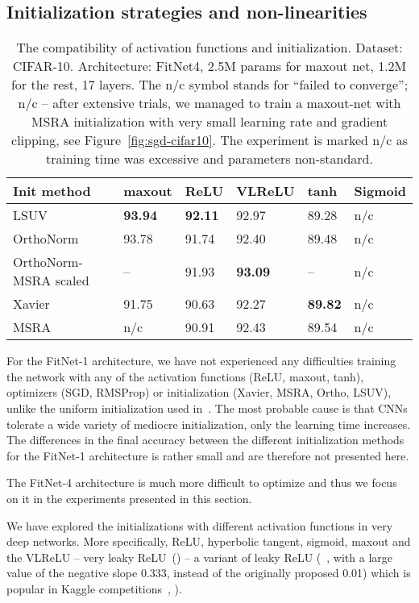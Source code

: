 \documentclass{article} \clearpage{}\usepackage{iclr2016_conference,times}
\begin{document}
\subsection{Initialization strategies and non-linearities}
\begin{table}[htb]
\caption{The compatibility of activation functions and initialization.
\hspace{\textwidth}
Dataset: CIFAR-10. Architecture: FitNet4, 2.5M params for maxout net, 1.2M for the rest, 17 layers. The n/c symbol stands for ``failed to converge''; n/c -- after extensive trials, we managed to train a maxout-net with MSRA initialization with very small learning rate and gradient clipping, see Figure~\ref{fig:sgd-cifar10}. The experiment is marked n/c as training time was excessive and parameters non-standard.}
\label{tab:activations}
\centering
\begin{tabular}{llllll}
\hline
Init method & maxout & ReLU  & VLReLU & tanh & Sigmoid \\
\hline
LSUV           & \textbf{93.94} & \textbf{92.11} & 92.97  & 89.28 & n/c \\
OrthoNorm      & 93.78          & 91.74          & 92.40           & 89.48 & n/c \\
OrthoNorm-MSRA scaled & --       & 91.93   & \textbf{93.09}  & -- & n/c \\
Xavier         & 91.75          & 90.63          & 92.27   & \textbf{89.82} & n/c \\
MSRA           & n/c   & 90.91          & 92.43           & 89.54 & n/c \\
\hline
\end{tabular}
\end{table}
 For the FitNet-1 architecture, we have not experienced any difficulties training the network with any of the activation functions (ReLU, maxout, tanh), optimizers (SGD, RMSProp) or initialization (Xavier, MSRA, Ortho, LSUV), unlike the uniform initialization used in~\cite{FitNets2014}. The most probable cause is that CNNs tolerate a wide variety of mediocre initialization, only the learning time increases.
The differences in the final accuracy between the different initialization methods for the FitNet-1 architecture is rather small and are therefore not presented here. 

The FitNet-4 architecture is much more difficult to optimize and thus we focus on it in the experiments
presented in this section.

We have explored the initializations with different activation functions in very deep networks. More specifically, ReLU, hyperbolic tangent, sigmoid, maxout and the VLReLU -- very leaky ReLU~(\cite{SparseConvNet2014}) -- a variant of leaky ReLU (~\cite{Maas2013}, with a large value of the negative slope 0.333, instead of the originally proposed 0.01) which is popular in Kaggle competitions~\cite{deepsea}, \cite{GrahamCIFAR}).
\end{document}
